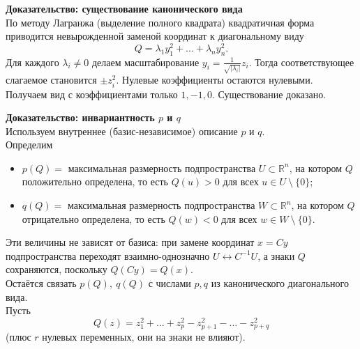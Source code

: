 \documentclass[14pt]{extreport}
\begin{document}
    \begin{prbox}
        \textbf{Доказательство: существование канонического вида}\\
        По методу Лагранжа (выделение полного квадрата) квадратичная форма приводится невырожденной заменой координат к диагональному виду
        \[
        Q = \lambda_1y_1^2 + ... + \lambda_ny_n^2.
        \]
        Для каждого $\lambda_i \neq 0$ делаем масштабирование $y_i = \frac{1}{\sqrt{|\lambda_i|}}z_i$. Тогда соответствующее слагаемое становится $\pm z_i^2$. Нулевые коэффициенты остаются нулевыми. Получаем вид с коэффициентами только $1,-1,0$. Существование доказано.

        \textbf{Доказательство: инвариантность $p$ и $q$}\\
        Используем внутреннее (базис-независимое) описание $p$ и $q$.\\
        Определим
        \begin{itemize}
            \item $p(Q)=$ максимальная размерность подпространства $U \subset \mathbb{R}^n$, на котором $Q$ положительно определена, то есть $Q(u) > 0$ для всех $u \in U\ \setminus\ \{0\}$;
            \item $q(Q)=$ максимальная размерность подпространства $W \subset \mathbb{R}^n$, на котором $Q$ отрицательно определена, то есть $Q(w) < 0$ для всех $w \in W\ \setminus\ \{0\}$.
        \end{itemize}
        Эти величины не зависят от базиса: при замене координат $x = Cy$ подпространства переходят взаимно-однозначно $U \leftrightarrow C^{-1}U$, а знаки $Q$ сохраняются, поскольку $Q(Cy) = Q(x)$.\\
        Остаётся связать $p(Q),\ q(Q)$ с числами $p,q$ из канонического диагонального вида.\\
        Пусть
        \[
        Q(z) = z_1^2 + ... + z_p^2 - z_{p+1}^2 - ... - z_{p+q}^2
        \]
        (плюс $r$ нулевых переменных, они на знаки не влияют).


\end{prbox}
\end{document}
